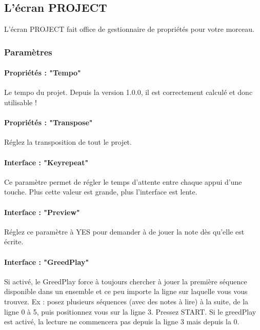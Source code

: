\documentclass[12pt,a4paper]{article}
\begin{document}
    \subsection{L'écran PROJECT}
    
    L'écran PROJECT fait office de gestionnaire de propriétés pour votre morceau.
    

    \subsubsection{Paramètres}

    \paragraph{Propriétés : "Tempo"} Le tempo du projet.
            Depuis la version 1.0.0, il est correctement calculé et donc utilisable !

    \paragraph{Propriétés : "Transpose"} Réglez la transposition de tout le projet.

    \paragraph{Interface : "Keyrepeat"} Ce paramètre permet de régler le temps d'attente entre chaque appui d'une touche.
                                        Plus cette valeur est grande, plus l'interface est lente.

    \paragraph{Interface : "Preview"} Réglez ce paramètre à YES pour demander à \FAT de jouer la note dès qu'elle est écrite.

    \paragraph{Interface : "GreedPlay"} Si activé, le GreedPlay force \FAT à toujours chercher à jouer la première séquence
                                        disponible dans un ensemble et ce peu importe la ligne sur laquelle vous vous trouvez.
                                        Ex : posez plusieurs séquences (avec des notes à lire) à la suite, de la ligne 0 à 5, puis positionnez vous sur la ligne 3.
                                        Pressez START. Si le greedPlay est activé, la lecture ne commencera pas depuis la ligne 3 mais depuis la 0.
\end{document}
